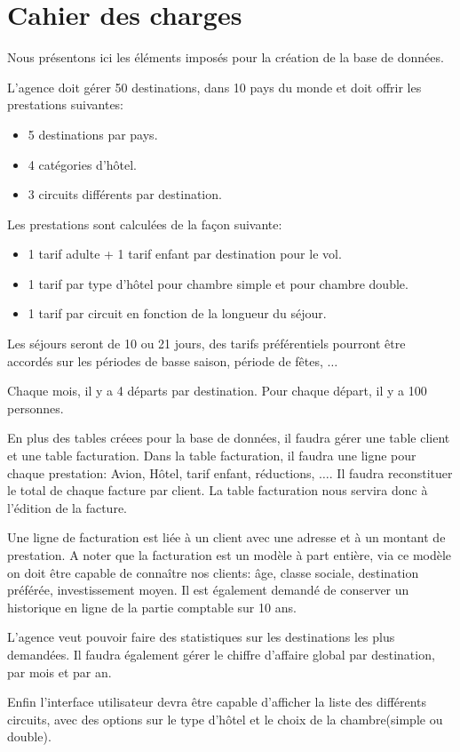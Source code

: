 \section{Cahier des charges}
Nous pr\'esentons ici les \'el\'ements impos\'es pour la cr\'eation de la base de donn\'ees.

L'agence doit g\'erer 50 destinations, dans 10 pays du monde et doit offrir les prestations suivantes:
\begin{itemize}
\item 5 destinations par pays.
\item 4 cat\'egories d'h\^otel.
\item 3 circuits diff\'erents par destination.\\
\end{itemize}

Les prestations sont calcul\'ees de la fa\c{c}on suivante:
\begin{itemize}
\item 1 tarif adulte + 1 tarif enfant par destination pour le vol.
\item 1 tarif par type d'h\^otel pour chambre simple et pour chambre double.
\item 1 tarif par circuit en fonction de la longueur du s\'ejour.\\
\end{itemize}

Les s\'ejours seront de 10 ou 21 jours, des tarifs pr\'ef\'erentiels pourront \^etre accord\'es sur les p\'eriodes de basse saison, p\'eriode de f\^etes, $\ldots$

Chaque mois, il y a 4 d\'eparts par destination. Pour chaque d\'epart, il y a 100 personnes.

En plus des tables cr\'eees pour la base de donn\'ees, il faudra g\'erer une table client et une table facturation. Dans la table facturation, il faudra une ligne pour chaque prestation: Avion, H\^otel, tarif enfant, r\'eductions, $\ldots$. Il faudra reconstituer le total de chaque facture par client. La table facturation nous servira donc \`a l'\'edition de la facture.

Une ligne de facturation est li\'ee \`a un client avec une adresse et \`a un montant de prestation. A noter que la facturation est un mod\`ele \`a part enti\`ere, via ce mod\`ele on doit \^etre capable de conna\^itre nos clients: \^age, classe sociale, destination pr\'ef\'er\'ee, investissement moyen. Il est \'egalement demand\'e de conserver un historique en ligne de la partie comptable sur 10 ans.

L'agence veut pouvoir faire des statistiques sur les destinations les plus demand\'ees. Il faudra \'egalement g\'erer le chiffre d'affaire global par destination, par mois et par an.

Enfin l'interface utilisateur devra \^etre capable d'afficher la liste des diff\'erents circuits, avec des options sur le type d'h\^otel et le choix de la chambre(simple ou double).

